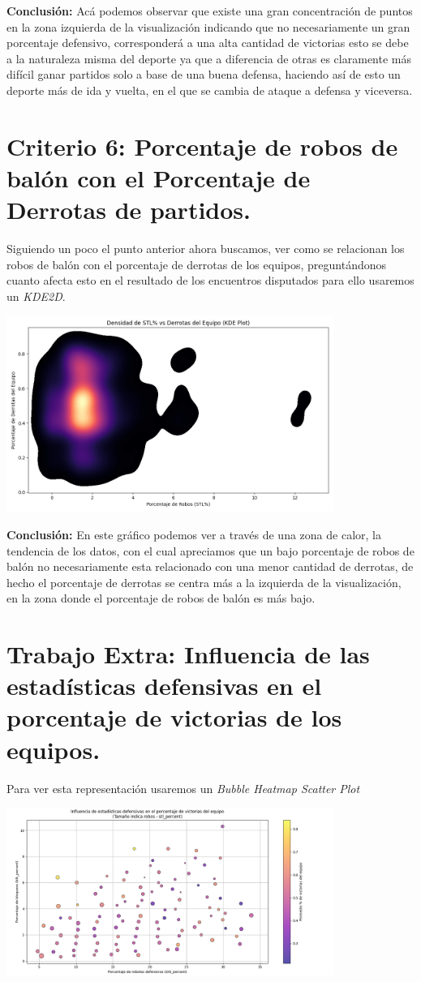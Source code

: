 \documentclass[12pt]{article}
\begin{document}
\textbf{Conclusión:} Acá podemos observar que existe una gran concentración de puntos en la zona izquierda de la visualización indicando que no necesariamente un gran porcentaje defensivo, corresponderá a una alta cantidad de victorias esto se debe a la naturaleza misma del deporte ya que a diferencia de otras es claramente más difícil ganar partidos solo a base de una buena defensa, haciendo así de esto un deporte más de ida y vuelta, en el que se cambia de ataque a defensa y viceversa.

\section*{Criterio 6: Porcentaje de robos de balón con el Porcentaje de Derrotas de partidos.}

Siguiendo un poco el punto anterior ahora buscamos, ver como se relacionan los robos de balón con el porcentaje de derrotas de los equipos, preguntándonos cuanto afecta esto en el resultado de los encuentros disputados para ello usaremos un \textit{KDE2D}.


\begin{center}
    \includegraphics[width=0.8\textwidth]{KDE2D.png}
\end{center}

\textbf{Conclusión:} En este gráfico podemos ver a través de una zona de calor, la tendencia de los datos, con el cual apreciamos que un bajo porcentaje de robos de balón no necesariamente esta relacionado con una menor cantidad de derrotas, de hecho el porcentaje de derrotas se centra más a la izquierda de la visualización, en la zona donde el porcentaje de robos de balón es más bajo.

\section*{Trabajo Extra: Influencia de las estadísticas defensivas en el porcentaje de victorias de los equipos.}
Para ver esta representación usaremos un \textit{Bubble Heatmap Scatter Plot}
\begin{center}
    \includegraphics[width=0.8\textwidth]{Figura_trabajo_extra.png}
\end{center}
\end{document}

